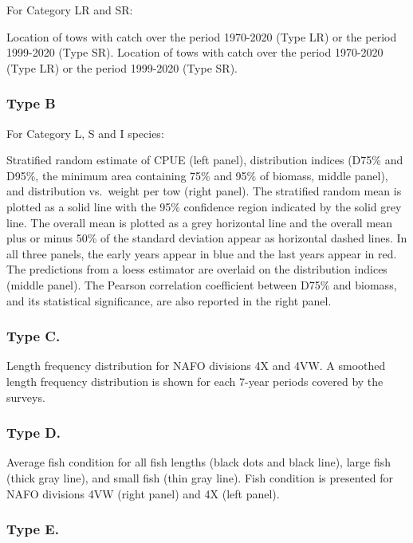 \documentclass[12pt]{article}\usepackage[]{graphicx}\usepackage[]{color}
\begin{document}
For Category LR and SR:

Location of tows with catch over the period 1970-2020 (Type LR) or the period 1999-2020 (Type SR). Location of tows with catch over the period 1970-2020 (Type LR) or the period 1999-2020 (Type SR).

\hypertarget{type-b}{%
\subsubsection{Type B}\label{type-b}}

For Category L, S and I species:

Stratified random estimate of CPUE (left panel), distribution indices (D75\% and D95\%, the minimum area containing 75\% and 95\% of biomass, middle panel), and distribution vs.~weight per tow (right panel). The stratified random mean is plotted as a solid line with the 95\% confidence region indicated by the solid grey line. The overall mean is plotted as a grey horizontal line and the overall mean plus or minus 50\% of the standard deviation appear as horizontal dashed lines. In all three panels, the early years appear in blue and the last years appear in red. The predictions from a loess estimator are overlaid on the distribution indices (middle panel). The Pearson correlation coefficient between D75\% and biomass, and its statistical significance, are also reported in the right panel.

\hypertarget{type-c.}{%
\subsubsection{Type C.}\label{type-c.}}

Length frequency distribution for NAFO divisions 4X and 4VW. A smoothed length frequency distribution is shown for each 7-year periods covered by the surveys.

\hypertarget{type-d.}{%
\subsubsection{Type D.}\label{type-d.}}

Average fish condition for all fish lengths (black dots and black line), large fish (thick gray line), and small fish (thin gray line). Fish condition is presented for NAFO divisions 4VW (right panel) and 4X (left panel).

\hypertarget{type-e.}{%
\subsubsection{Type E.}\label{type-e.}}
\end{document}

